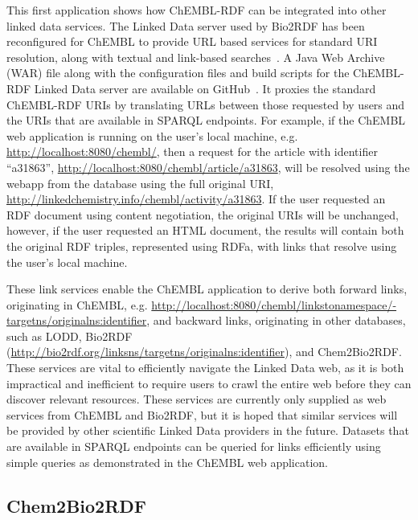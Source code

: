 \documentclass[10pt]{bmc_article}
\newenvironment{bmcformat}{\begin{raggedright}\baselineskip20pt\sloppy\setboolean{publ}{false}}{\end{raggedright}\baselineskip20pt\sloppy}
\begin{document}
\begin{bmcformat}
This first application shows how ChEMBL-RDF can be integrated into other linked data services.
The Linked Data server used by Bio2RDF has been reconfigured for ChEMBL to provide URL
based services for standard URI resolution, along with textual and link-based searches~\cite{Ansell2011}. 
A Java Web Archive (WAR) file along with the configuration files and build scripts for the ChEMBL-RDF Linked Data server are available on GitHub~\cite{WebAppGitHub}. 
It proxies the standard ChEMBL-RDF URIs by translating URLs between those requested by users and the URIs that are available
in SPARQL endpoints. For example, if the ChEMBL web application is running on the user's
local machine, e.g. \url{http://localhost:8080/chembl/}, then a request for the
article with identifier ``a31863'', \url{http://localhost:8080/chembl/article/a31863},
will be resolved using the webapp from the database using the full original URI,
\url{http://linkedchemistry.info/chembl/activity/a31863}. If the
user requested an RDF document using content negotiation, the original URIs will be unchanged,
however, if the user requested an HTML document, the results will contain both the
original RDF triples, represented using RDFa, with links that resolve using the user's local machine.

These link services enable the ChEMBL application to derive both forward links, originating in
ChEMBL, e.g. \url{http://localhost:8080/chembl/linkstonamespace/-targetns/originalns:identifier},
and backward links, originating in other databases, such as LODD, Bio2RDF
(\url{http://bio2rdf.org/linksns/targetns/originalns:identifier}), and Chem2Bio2RDF.
These services are vital to efficiently navigate the Linked Data web, as it is both
impractical and inefficient to require users to crawl the entire web before they can discover 
relevant resources. These services are currently only supplied as web services from ChEMBL and
Bio2RDF, but it is hoped that similar services will be provided by other scientific Linked Data
providers in the future. Datasets that are available in SPARQL endpoints can be queried for
links efficiently using simple queries as demonstrated in the ChEMBL web application.

\subsection*{Chem2Bio2RDF}


\end{bmcformat}
\end{document}
